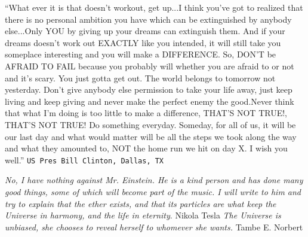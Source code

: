 \par 
\textsf{“What ever it is that doesn’t workout, get up...I think you’ve got to realized that there is no personal ambition you have which can be extinguished by anybody else...Only YOU by giving up your dreams can extinguish them. And if your dreams doesn’t work out EXACTLY like you intended, it will still take you someplace interesting and you will make a DIFFERENCE. So, DON’T be AFRAID TO FAIL because you probably will whether you are afraid to or not and it's scary. You just gotta get out. 
The world belongs to tomorrow not yesterday. Don’t give anybody else permission to take your life away, just keep living and keep giving and never make the perfect enemy the good.Never think that what I’m doing is too little to make a difference, THAT'S NOT TRUE!, THAT'S NOT TRUE!  Do something everyday. Someday, for all of us, it will be our last day and what would matter will be all the steps we took along the way and what they amounted to, NOT the home run we hit on day X. I wish you well.”}
\newline
\texttt{US Pres  Bill Clinton, Dallas, TX}
\par

\textit{No, I have nothing against Mr. Einstein. He is a kind person and has done many good things, some of which will become part of the music. I will write to him and try to explain that the ether exists, and that its particles are what keep the Universe in harmony, and the life in eternity}. 
\newline
Nikola Tesla
\newline
\textit{The Universe is unbiased, she chooses to reveal herself to whomever she wants.}
\newline
Tambe E. Norbert

